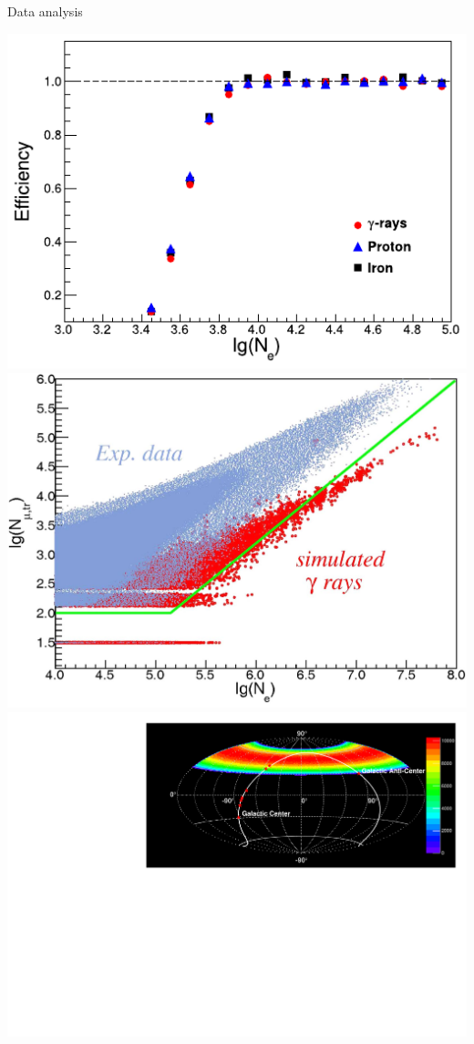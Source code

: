 \begin{frame}{Data analysis}
\begin{center}
  \includegraphics[height=0.39\textheight]{pics/eff_Ne_Donghwa.pdf}\hspace{1em}
  \includegraphics[height=0.39\textheight]{pics/gamma_cut.png}\\
  \includegraphics[height=0.42\textheight]{pics/Skyexp_mc.pdf}
\end{center}
\end{frame}

